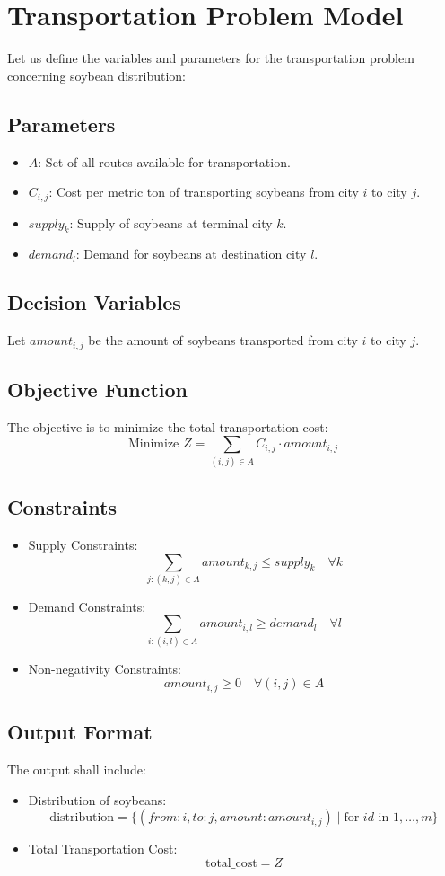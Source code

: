 \documentclass{article}
\begin{document}
\section*{Transportation Problem Model}

Let us define the variables and parameters for the transportation problem concerning soybean distribution:

\subsection*{Parameters}
\begin{itemize}
    \item $A$: Set of all routes available for transportation.
    \item $C_{i,j}$: Cost per metric ton of transporting soybeans from city $i$ to city $j$.
    \item $supply_k$: Supply of soybeans at terminal city $k$.
    \item $demand_l$: Demand for soybeans at destination city $l$.
\end{itemize}

\subsection*{Decision Variables}
Let $amount_{i,j}$ be the amount of soybeans transported from city $i$ to city $j$.

\subsection*{Objective Function}
The objective is to minimize the total transportation cost:
\[
\text{Minimize } Z = \sum_{(i,j) \in A} C_{i,j} \cdot amount_{i,j}
\]

\subsection*{Constraints}
\begin{itemize}
    \item Supply Constraints:
    \[
    \sum_{j: (k,j) \in A} amount_{k,j} \leq supply_k \quad \forall k
    \]

    \item Demand Constraints:
    \[
    \sum_{i: (i,l) \in A} amount_{i,l} \geq demand_l \quad \forall l
    \]

    \item Non-negativity Constraints:
    \[
    amount_{i,j} \geq 0 \quad \forall (i,j) \in A
    \]
\end{itemize}

\subsection*{Output Format}
The output shall include:
\begin{itemize}
    \item Distribution of soybeans:
    \[
    \text{distribution} = \{ (from: i, to: j, amount: amount_{i,j}) \mid \text{for } id \text{ in } 1, \ldots, m \}
    \]
    \item Total Transportation Cost:
    \[
    \text{total\_cost} = Z
    \]
\end{itemize}
\end{document}

